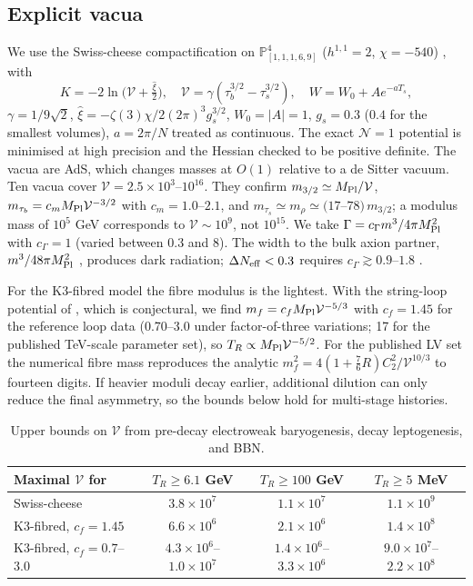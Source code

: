 \documentclass[11pt]{article}
\newcommand{\Mpl}{M_{\rm Pl}}
\newcommand{\vol}{\mathcal{V}}
\begin{document}
\subsection{Explicit vacua}
We use the Swiss-cheese compactification on $\mathbb P^4_{[1,1,1,6,9]}$ ($h^{1,1}=2$, $\chi=-540$) \cite{BBCQ}, with
\begin{equation}
K=-2\ln\!\big(\mathcal V+\tfrac{\hat\xi}{2}\big),\quad\mathcal V=\gamma(\tau_b^{3/2}-\tau_s^{3/2}),\quad W=W_0+Ae^{-aT_s},
\end{equation}
$\gamma=1/9\sqrt2$, $\hat\xi=-\zeta(3)\chi/2(2\pi)^3g_s^{3/2}$, $W_0=|A|=1$, $g_s=0.3$ ($0.4$ for the smallest volumes), $a=2\pi/N$ treated as continuous. The exact $\mathcal N=1$ potential is minimised at high precision and the Hessian checked to be positive definite. The vacua are AdS, which changes masses at $O(1)$ relative to a de Sitter vacuum. Ten vacua cover $\vol=2.5\times10^3$--$10^{16}$. They confirm $m_{3/2}\simeq\Mpl/\vol$, $m_{\tau_b}=c_m\Mpl\vol^{-3/2}$ with $c_m=1.0$--$2.1$, and $m_{\tau_s}\simeq m_\rho\simeq(17$--$78)\,m_{3/2}$; a modulus mass of $10^5$ GeV corresponds to $\vol\sim10^9$, not $10^{15}$. We take $\Gamma=c_\Gamma m^3/4\pi\Mpl^2$ with $c_\Gamma=1$ (varied between 0.3 and 8). The width to the bulk axion partner, $m^3/48\pi\Mpl^2$ \cite{CCQ}, produces dark radiation; $\Delta N_{\rm eff}<0.3$ requires $c_\Gamma\gtrsim0.9$--$1.8$ \cite{HT}.

For the K3-fibred model \cite{CBQ} the fibre modulus is the lightest. With the string-loop potential of \cite{CBQ}, which is conjectural, we find $m_f=c_f\Mpl\vol^{-5/3}$ with $c_f=1.45$ for the reference loop data (0.70--3.0 under factor-of-three variations; 17 for the published TeV-scale parameter set), so $T_R\propto\Mpl\vol^{-5/2}$. For the published LV set the numerical fibre mass reproduces the analytic $m_f^2=4(1+\tfrac76R)C_2^2/\vol^{10/3}$ to fourteen digits. If heavier moduli decay earlier, additional dilution can only reduce the final asymmetry, so the bounds below hold for multi-stage histories.

\begin{table}[h]\centering
\begin{tabular}{lccc}\toprule
Maximal $\vol$ for & $T_R\ge6.1$ GeV & $T_R\ge100$ GeV & $T_R\ge5$ MeV\\ \midrule
Swiss-cheese & $3.8\times10^7$ & $1.1\times10^7$ & $1.1\times10^9$\\
K3-fibred, $c_f=1.45$ & $6.6\times10^6$ & $2.1\times10^6$ & $1.4\times10^8$\\
K3-fibred, $c_f=0.7$--$3.0$ & $4.3\times10^6$--$1.0\times10^7$ & $1.4\times10^6$--$3.3\times10^6$ & $9.0\times10^7$--$2.2\times10^8$\\ \bottomrule
\end{tabular}
\caption{Upper bounds on $\vol$ from pre-decay electroweak baryogenesis, decay leptogenesis, and BBN.}\label{tab:vol}\end{table}
\end{document}
